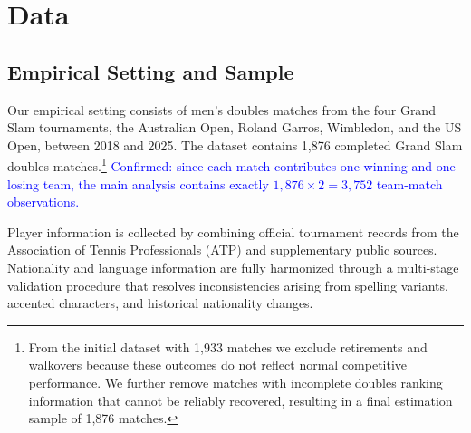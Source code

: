 \documentclass[10pt]{article}
\begin{document}
\section{Data}
\subsection{Empirical Setting and Sample}
Our empirical setting consists of men's doubles matches from the four Grand Slam tournaments, the Australian Open, Roland Garros, Wimbledon, and the US Open, between 2018 and 2025. The dataset contains 1,876 completed Grand Slam doubles matches.\footnote{From the initial dataset with 1,933  matches we exclude retirements and walkovers because these outcomes do not reflect normal competitive performance. We further remove matches with incomplete doubles ranking information that cannot be reliably recovered, resulting in a final estimation sample of 1,876 matches.} \textcolor{blue}{Confirmed: since each match contributes one winning and one losing team, the main analysis contains exactly $1{,}876 \times 2 = 3{,}752$ team-match observations.}

Player information is collected by combining official tournament records from the Association of Tennis Professionals (ATP)  and supplementary public sources. Nationality and language information are fully harmonized through a multi-stage validation procedure that resolves inconsistencies arising from spelling variants, accented characters, and historical nationality changes. %
\end{document}
